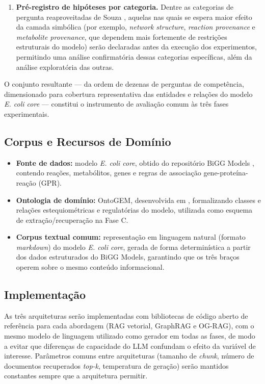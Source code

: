 \documentclass{article}
\begin{document}
\begin{enumerate}
	\item \textbf{Pré-registro de hipóteses por categoria.} Dentre as categorias de pergunta reaproveitadas de Souza \cite{souza2025ontogem}, aquelas nas quais se espera maior efeito da camada simbólica (por exemplo, \textit{network structure}, \textit{reaction provenance} e \textit{metabolite provenance}, que dependem mais fortemente de restrições estruturais do modelo) serão declaradas antes da execução dos experimentos, permitindo uma análise confirmatória dessas categorias específicas, além da análise exploratória das outras.
\end{enumerate}

O conjunto resultante --- da ordem de dezenas de perguntas de competência, dimensionado para cobertura representativa das entidades e relações do modelo \textit{E. coli core} --- constitui o instrumento de avaliação comum às três fases experimentais.

\subsection{Corpus e Recursos de Domínio}

\begin{itemize}
	\item \textbf{Fonte de dados:} modelo \textit{E. coli core}, obtido do repositório BiGG Models \cite{king2016bigg}, contendo reações, metabólitos, genes e regras de associação gene-proteína-reação (GPR).
	\item \textbf{Ontologia de domínio:} OntoGEM, desenvolvida em \cite{souza2025ontogem}, formalizando classes e relações estequiométricas e regulatórias do modelo, utilizada como esquema de extração/recuperação na Fase C.
	\item \textbf{Corpus textual comum:} representação em linguagem natural (formato \textit{markdown}) do modelo \textit{E. coli core}, gerada de forma determinística a partir dos dados estruturados do BiGG Models, garantindo que os três braços operem sobre o mesmo conteúdo informacional.
	
\end{itemize}

\subsection{Implementação}

As três arquiteturas serão implementadas com bibliotecas de código aberto de referência para cada abordagem (RAG vetorial, GraphRAG e OG-RAG), com o mesmo modelo de linguagem utilizado como gerador em todas as fases, de modo a evitar que diferenças de capacidade do LLM confundam o efeito da variável de interesse. Parâmetros comuns entre arquiteturas (tamanho de \textit{chunk}, número de documentos recuperados \textit{top-k}, temperatura de geração) serão mantidos constantes sempre que a arquitetura permitir.
\end{document}
